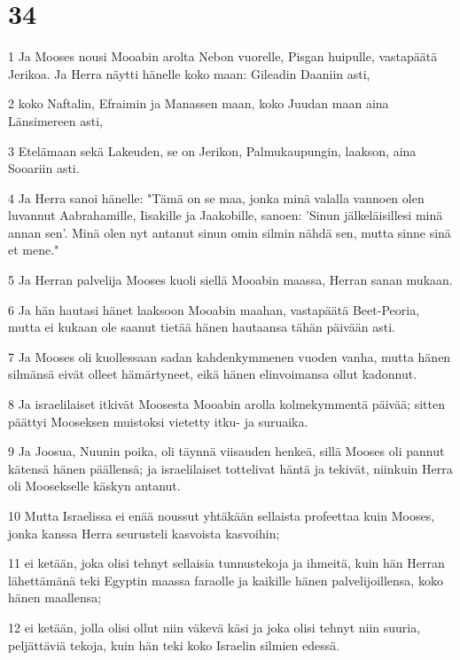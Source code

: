 \chapter{34}

\par 1 Ja Mooses nousi Mooabin arolta Nebon vuorelle, Pisgan huipulle, vastapäätä Jerikoa. Ja Herra näytti hänelle koko maan: Gileadin Daaniin asti,
\par 2 koko Naftalin, Efraimin ja Manassen maan, koko Juudan maan aina Länsimereen asti,
\par 3 Etelämaan sekä Lakeuden, se on Jerikon, Palmukaupungin, laakson, aina Sooariin asti.
\par 4 Ja Herra sanoi hänelle: "Tämä on se maa, jonka minä valalla vannoen olen luvannut Aabrahamille, Iisakille ja Jaakobille, sanoen: 'Sinun jälkeläisillesi minä annan sen'. Minä olen nyt antanut sinun omin silmin nähdä sen, mutta sinne sinä et mene."
\par 5 Ja Herran palvelija Mooses kuoli siellä Mooabin maassa, Herran sanan mukaan.
\par 6 Ja hän hautasi hänet laaksoon Mooabin maahan, vastapäätä Beet-Peoria, mutta ei kukaan ole saanut tietää hänen hautaansa tähän päivään asti.
\par 7 Ja Mooses oli kuollessaan sadan kahdenkymmenen vuoden vanha, mutta hänen silmänsä eivät olleet hämärtyneet, eikä hänen elinvoimansa ollut kadonnut.
\par 8 Ja israelilaiset itkivät Moosesta Mooabin arolla kolmekymmentä päivää; sitten päättyi Mooseksen muistoksi vietetty itku- ja suruaika.
\par 9 Ja Joosua, Nuunin poika, oli täynnä viisauden henkeä, sillä Mooses oli pannut kätensä hänen päällensä; ja israelilaiset tottelivat häntä ja tekivät, niinkuin Herra oli Moosekselle käskyn antanut.
\par 10 Mutta Israelissa ei enää noussut yhtäkään sellaista profeettaa kuin Mooses, jonka kanssa Herra seurusteli kasvoista kasvoihin;
\par 11 ei ketään, joka olisi tehnyt sellaisia tunnustekoja ja ihmeitä, kuin hän Herran lähettämänä teki Egyptin maassa faraolle ja kaikille hänen palvelijoillensa, koko hänen maallensa;
\par 12 ei ketään, jolla olisi ollut niin väkevä käsi ja joka olisi tehnyt niin suuria, peljättäviä tekoja, kuin hän teki koko Israelin silmien edessä.


